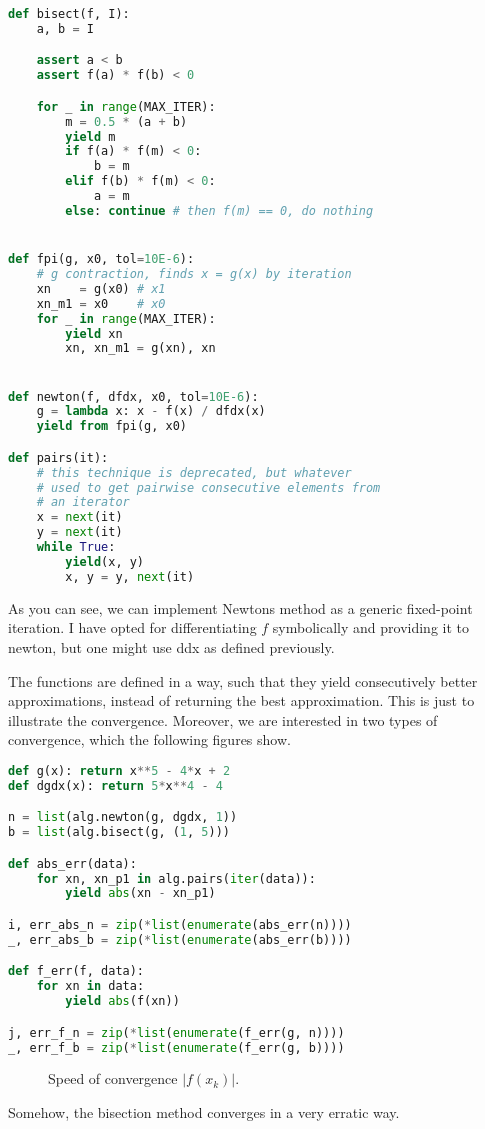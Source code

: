 \documentclass[12pt]{article}
\begin{document}
\begin{multicols}{2}
\begin{lstlisting}[language=Python, caption={Bisection and Newtons method}]
def bisect(f, I):
    a, b = I

    assert a < b
    assert f(a) * f(b) < 0

    for _ in range(MAX_ITER):
        m = 0.5 * (a + b)
        yield m
        if f(a) * f(m) < 0:
            b = m
        elif f(b) * f(m) < 0:
            a = m
        else: continue # then f(m) == 0, do nothing


def fpi(g, x0, tol=10E-6):
    # g contraction, finds x = g(x) by iteration
    xn    = g(x0) # x1
    xn_m1 = x0    # x0
    for _ in range(MAX_ITER):
        yield xn
        xn, xn_m1 = g(xn), xn


def newton(f, dfdx, x0, tol=10E-6):
    g = lambda x: x - f(x) / dfdx(x)
    yield from fpi(g, x0)

def pairs(it):
    # this technique is deprecated, but whatever
    # used to get pairwise consecutive elements from
    # an iterator
    x = next(it)
    y = next(it)
    while True:
        yield(x, y)
        x, y = y, next(it)
\end{lstlisting}
As you can see, we can implement Newtons method
as a generic fixed-point iteration.
I have opted for differentiating $f$ symbolically
and providing it to {\ttfamily newton}, but
one might use {\ttfamily ddx} as defined previously.

The functions are defined in a way, such that they
yield consecutively better approximations, instead
of returning the best approximation.
This is just to illustrate the convergence.
Moreover, we are interested in two types of convergence,
which the following figures show.

\begin{lstlisting}[language=Python, caption={Comparing the two methods}]
def g(x): return x**5 - 4*x + 2
def dgdx(x): return 5*x**4 - 4

n = list(alg.newton(g, dgdx, 1))
b = list(alg.bisect(g, (1, 5)))

def abs_err(data):
    for xn, xn_p1 in alg.pairs(iter(data)):
        yield abs(xn - xn_p1)

i, err_abs_n = zip(*list(enumerate(abs_err(n))))
_, err_abs_b = zip(*list(enumerate(abs_err(b))))

def f_err(f, data):
    for xn in data:
        yield abs(f(xn))

j, err_f_n = zip(*list(enumerate(f_err(g, n))))
_, err_f_b = zip(*list(enumerate(f_err(g, b))))
\end{lstlisting}
\begin{figure}[H]
\centering

\caption{
    Speed of convergence $|f(x_k)|$.
}
\end{figure}
\noindent
Somehow, the bisection method converges in a very erratic way.


\end{multicols}
\end{document}
